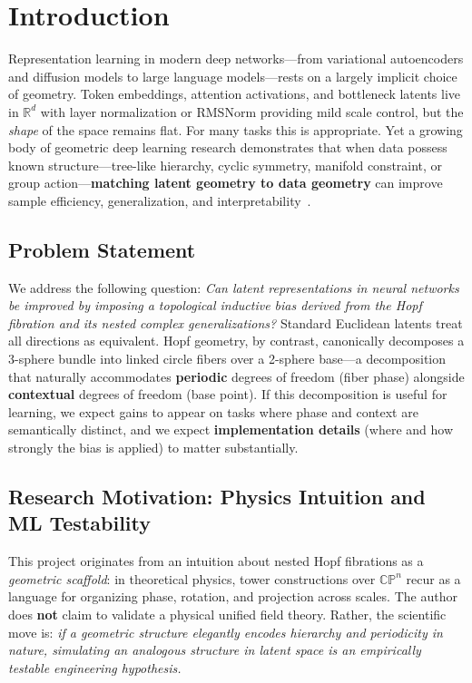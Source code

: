 \documentclass[11pt,twocolumn]{article}
\begin{document}
\section{Introduction}

Representation learning in modern deep networks---from variational autoencoders and diffusion models to large language models---rests on a largely implicit choice of geometry. Token embeddings, attention activations, and bottleneck latents live in $\mathbb{R}^d$ with layer normalization or RMSNorm providing mild scale control, but the \emph{shape} of the space remains flat. For many tasks this is appropriate. Yet a growing body of geometric deep learning research demonstrates that when data possess known structure---tree-like hierarchy, cyclic symmetry, manifold constraint, or group action---\textbf{matching latent geometry to data geometry} can improve sample efficiency, generalization, and interpretability~\cite{bronstein2021,nickel2017,ganea2018}.

\subsection{Problem Statement}

We address the following question: \emph{Can latent representations in neural networks be improved by imposing a topological inductive bias derived from the Hopf fibration and its nested complex generalizations?} Standard Euclidean latents treat all directions as equivalent. Hopf geometry, by contrast, canonically decomposes a 3-sphere bundle into linked circle fibers over a 2-sphere base---a decomposition that naturally accommodates \textbf{periodic} degrees of freedom (fiber phase) alongside \textbf{contextual} degrees of freedom (base point). If this decomposition is useful for learning, we expect gains to appear on tasks where phase and context are semantically distinct, and we expect \textbf{implementation details} (where and how strongly the bias is applied) to matter substantially.

\subsection{Research Motivation: Physics Intuition and ML Testability}

This project originates from an intuition about nested Hopf fibrations as a \emph{geometric scaffold}: in theoretical physics, tower constructions over $\mathbb{CP}^n$ recur as a language for organizing phase, rotation, and projection across scales. The author does \textbf{not} claim to validate a physical unified field theory. Rather, the scientific move is: \emph{if a geometric structure elegantly encodes hierarchy and periodicity in nature, simulating an analogous structure in latent space is an empirically testable engineering hypothesis.}
\end{document}
